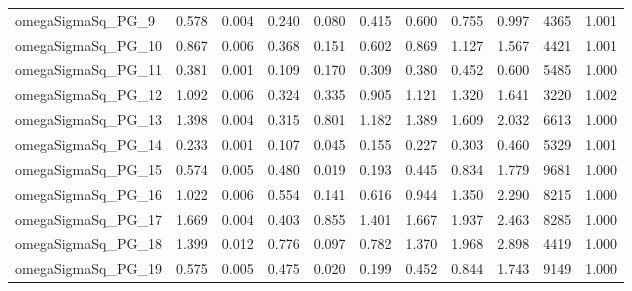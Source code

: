 \documentclass[12pt]{article}
\begin{document}
\begin{longtable}{lrrrrrrrrrr}
omegaSigmaSq\_PG\_9  & 0.578 & 0.004 & 0.240 & 0.080 & 0.415 & 0.600 & 0.755 & 0.997 &  4365 & 1.001 \\
omegaSigmaSq\_PG\_10 & 0.867 & 0.006 & 0.368 & 0.151 & 0.602 & 0.869 & 1.127 & 1.567 &  4421 & 1.001 \\
omegaSigmaSq\_PG\_11 & 0.381 & 0.001 & 0.109 & 0.170 & 0.309 & 0.380 & 0.452 & 0.600 &  5485 & 1.000 \\
omegaSigmaSq\_PG\_12 & 1.092 & 0.006 & 0.324 & 0.335 & 0.905 & 1.121 & 1.320 & 1.641 &  3220 & 1.002 \\
omegaSigmaSq\_PG\_13 & 1.398 & 0.004 & 0.315 & 0.801 & 1.182 & 1.389 & 1.609 & 2.032 &  6613 & 1.000 \\
omegaSigmaSq\_PG\_14 & 0.233 & 0.001 & 0.107 & 0.045 & 0.155 & 0.227 & 0.303 & 0.460 &  5329 & 1.001 \\
omegaSigmaSq\_PG\_15 & 0.574 & 0.005 & 0.480 & 0.019 & 0.193 & 0.445 & 0.834 & 1.779 &  9681 & 1.000 \\
omegaSigmaSq\_PG\_16 & 1.022 & 0.006 & 0.554 & 0.141 & 0.616 & 0.944 & 1.350 & 2.290 &  8215 & 1.000 \\
omegaSigmaSq\_PG\_17 & 1.669 & 0.004 & 0.403 & 0.855 & 1.401 & 1.667 & 1.937 & 2.463 &  8285 & 1.000 \\
omegaSigmaSq\_PG\_18 & 1.399 & 0.012 & 0.776 & 0.097 & 0.782 & 1.370 & 1.968 & 2.898 &  4419 & 1.000 \\
omegaSigmaSq\_PG\_19 & 0.575 & 0.005 & 0.475 & 0.020 & 0.199 & 0.452 & 0.844 & 1.743 &  9149 & 1.000 \\
\end{longtable}
\endgroup


\newpage
\end{document}

